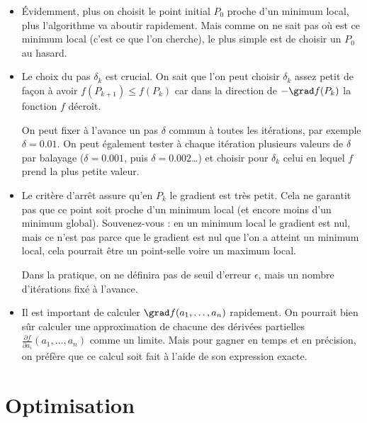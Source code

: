 \documentclass[10pt,class=report,crop=false]{standalone}
\begin{document}
\begin{remarque*}
\sauteligne
\begin{itemize}
  \item \'Evidemment, plus on choisit le point initial $P_0$ proche d'un minimum local, plus l'algorithme va aboutir rapidement. Mais comme on ne sait pas où est ce minimum local (c'est ce que l'on cherche), le plus simple est de choisir un $P_0$ au hasard.

  \item Le choix du pas $\delta_k$ est crucial. On sait que l'on peut choisir $\delta_k$ assez petit de façon à avoir $f(P_{k+1}) \le f(P_k)$ car dans la direction de $-\grad f(P_k)$ la fonction $f$ décroît.
  
  
  On peut fixer à l'avance un pas $\delta$ commun à toutes les itérations, par exemple $\delta = 0.01$. On peut également tester à chaque itération plusieurs valeurs de $\delta$ par balayage ($\delta = 0.001$, puis $\delta=0.002$\ldots) et choisir pour $\delta_k$ celui en lequel $f$ prend la plus petite valeur.
  
  \item Le critère d'arrêt assure qu'en $P_k$ le gradient est très petit. Cela ne garantit pas que ce point soit proche d'un minimum local (et encore moins d'un minimum global). Souvenez-vous : en un minimum local le gradient est nul, mais ce n'est pas parce que le gradient est nul que l'on a atteint un minimum local, cela pourrait être un point-selle voire un maximum local.
  
    Dans la pratique, on ne définira pas de seuil d'erreur $\epsilon$, mais un nombre d'itérations fixé à l'avance.
  
  \item Il est important de calculer $\grad f(a_1,\ldots,a_n)$ rapidement. On pourrait bien sûr calculer une approximation de chacune des dérivées partielles $\frac{\partial f}{\partial a_i}(a_1,\ldots,a_n)$ comme un limite. Mais pour gagner en temps et en précision, on préfère que ce calcul soit fait à l'aide de son expression exacte. 
  
\end{itemize}
\end{remarque*}



\section{Optimisation}
\end{document}
